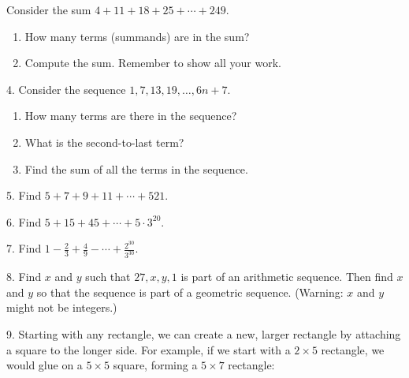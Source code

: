 \documentclass[10pt,]{book}
\theoremstyle{plain}
\theoremstyle{definition}
\theoremstyle{definition}
\theoremstyle{definition}
\theoremstyle{definition}
\numberwithin{equation}{chapter}
\begin{document}
\begin{exerciselist}
Consider the sum \(4 + 11 + 18 + 25 + \cdots + 249\).%
\par
\hypertarget{p-192}{}%
\leavevmode%
\begin{enumerate}[label=(\alph*)]
\item\hypertarget{li-115}{}\hypertarget{p-193}{}%
How many terms (summands) are in the sum?%
\item\hypertarget{li-116}{}\hypertarget{p-194}{}%
Compute the sum. Remember to show all your work.%
\end{enumerate}
%
\par\smallskip
\item[4.]\hypertarget{exercise-13}{}\hypertarget{p-197}{}%
Consider the sequence \(1, 7, 13, 19, \ldots, 6n + 7\).%
\par
\hypertarget{p-198}{}%
\leavevmode%
\begin{enumerate}[label=(\alph*)]
\item\hypertarget{li-119}{}\hypertarget{p-199}{}%
How many terms are there in the sequence?%
\item\hypertarget{li-120}{}\hypertarget{p-200}{}%
What is the second-to-last term?%
\item\hypertarget{li-121}{}\hypertarget{p-201}{}%
Find the sum of all the terms in the sequence.%
\end{enumerate}
%
\par\smallskip
\item[5.]\hypertarget{exercise-14}{}\hypertarget{p-203}{}%
Find \(5 + 7 + 9 + 11+ \cdots + 521\).%
\par\smallskip
\item[6.]\hypertarget{exercise-15}{}\hypertarget{p-205}{}%
Find \(5 + 15 + 45 + \cdots + 5\cdot 3^{20}\).%
\par\smallskip
\item[7.]\hypertarget{exercise-16}{}\hypertarget{p-207}{}%
Find \(1 - \frac{2}{3} + \frac{4}{9} - \cdots + \frac{2^{30}}{3^{30}}\).%
\par\smallskip
\item[8.]\hypertarget{exercise-17}{}\hypertarget{p-208}{}%
Find \(x\) and \(y\) such that \(27, x, y, 1\) is part of an arithmetic sequence. Then find \(x\) and \(y\) so that the sequence is part of a geometric sequence. (Warning: \(x\) and \(y\) might not be integers.)%
\par\smallskip
\item[9.]\hypertarget{exercise-18}{}\hypertarget{p-209}{}%
Starting with any rectangle, we can create a new, larger rectangle by attaching a square to the longer side. For example, if we start with a \(2\times 5\) rectangle, we would glue on a \(5\times 5\) square, forming a \(5 \times 7\) rectangle:%

\end{exerciselist}
\end{document}
